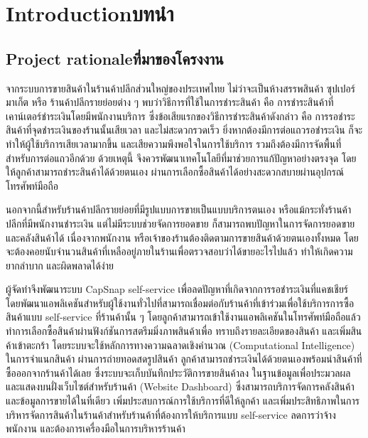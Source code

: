 \chapter{\ifenglish Introduction\else บทนำ\fi}

\section{\ifenglish Project rationale\else ที่มาของโครงงาน\fi}
\par จากระบบการขายสินค้าในร้านค้าปลีกส่วนใหญ่ของประเทศไทย ไม่ว่าจะเป็นห้างสรรพสินค้า ซุปเปอร์มาเก็ต หรือ
ร้านค้าปลีกรายย่อยต่าง ๆ พบว่าวิธีการที่ใช้ในการชำระสินค้า คือ การชำระสินค้าที่เคาน์เตอร์ชำระเงินโดยมีพนักงานบริการ
ซึ่งข้อเสียแรกของวิธีการชำระสินค้าดังกล่าว คือ การรอชำระสินค้าที่จุดชำระเงินของร้านนั้นเสียเวลา และไม่สะดวกรวดเร็ว
ยิ่งหากต้องมีการต่อแถวรอชำระเงิน ก็จะทำให้ผู้ใช้บริการเสียเวลามากขึ้น และเสียความพึงพอใจในการใช้บริการ
รวมถึงต้องมีการจัดพื้นที่สำหรับการต่อแถวอีกด้วย ด้วยเหตุนี้ จึงควรพัฒนาเทคโนโลยีที่มาช่วยการแก้ปัญหาอย่างตรงจุด
โดยให้ลูกค้าสามารถชำระสินค้าได้ด้วยตนเอง ผ่านการเลือกซื้อสินค้าได้อย่างสะดวกสบายผ่านอุปกรณ์โทรศัพท์มือถือ

นอกจากนี้สำหรับร้านค้าปลีกรายย่อยที่มีรูปแบบการขายเป็นแบบบริการตนเอง หรือแม้กระทั่งร้านค้าปลีกที่มีพนักงานชำระเงิน
แต่ไม่มีระบบช่วยจัดการยอดขาย ก็สามารถพบปัญหาในการจัดการยอดขาย และคลังสินค้าได้ เนื่องจากพนักงาน
หรือเจ้าของร้านต้องติดตามการขายสินค้าด้วยตนเองทั้งหมด โดยจะต้องคอยนับจํานวนสินค้าที่เหลืออยู่ภายในร้านเพื่อตรวจสอบว่าได้ขายอะไรไปแล้ว
ทำให้เกิดความยากลำบาก และผิดพลาดได้ง่าย

ผู้จัดทําจึงพัฒนาระบบ CapSnap self-service เพื่อลดปัญหาที่เกิดจากการรอชำระเงินที่แคชเชียร์
โดยพัฒนาแอพลิเคชันสำหรับผู้ใช้งานทั่วไปที่สามารถเชื่อมต่อกับร้านค้าที่เข้าร่วมเพื่อใช้บริการการซื้อสินค้าแบบ self-service
ที่ร้านค้านั้น ๆ โดยลูกค้าสามารถเข้าใช้งานแอพลิเคชันในโทรศัพท์มือถือแล้วทำการเลือกซื้อสินค้าผ่านฟังก์ชันการสตรีมมิ่งภาพสินค้าเพื่อ
ทราบถึงรายละเอียดของสินค้า และเพิ่มสินค้าเข้าตะกร้า โดยระบบจะใช้หลักการทางความฉลาดเชิงคำนวณ (Computational Intelligence) ในการจำแนกสินค้า
ผ่านการถ่ายทอดสดรูปสินค้า ลูกค้าสามารถชำระเงินได้ด้วยตนเองพร้อมนำสินค้าที่ซื้อออกจากร้านค้าได้เลย ซึ่งระบบจะเก็บบันทึกประวัติการขายสินค้าลง
ในฐานข้อมูลเพื่อประมวลผล และแสดงบนฝั่งเว็บไซต์สำหรับร้านค้า (Website Dashboard) ซึ่งสามารถบริการจัดการคลังสินค้า และข้อมูลการขายได้ในที่เดียว
เพิ่มประสบการณ์การใช้บริการที่ดีให้ลูกค้า และเพิ่มประสิทธิภาพในการบริหารจัดการสินค้าในร้านค้าสำหรับร้านค้าที่ต้องการให้บริการแบบ
self-service ลดการว่าจ้างพนักงาน และต้องการเครื่องมือในการบริหารร้านค้า



